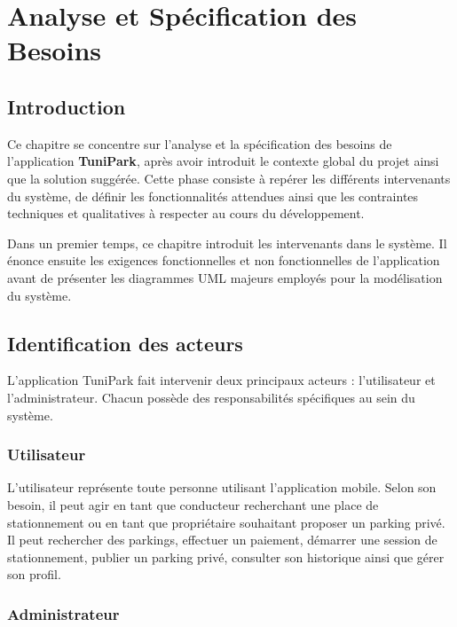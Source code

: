 \chapter{Analyse et Spécification des Besoins}
\label{chap:requirements_analysis}

\section{Introduction}

\par Ce chapitre se concentre sur l'analyse et la spécification des besoins de l'application \textbf{TuniPark}, après avoir introduit le contexte global du projet ainsi que la solution suggérée. Cette phase consiste à repérer les différents intervenants du système, de définir les fonctionnalités attendues ainsi que les contraintes techniques et qualitatives à respecter au cours du développement.

\par Dans un premier temps, ce chapitre introduit les intervenants dans le système. Il énonce ensuite les exigences fonctionnelles et non fonctionnelles de l'application avant de présenter les diagrammes UML majeurs employés pour la modélisation du système.
\section{Identification des acteurs}

\par L'application TuniPark fait intervenir deux principaux acteurs : l'utilisateur et l'administrateur. Chacun possède des responsabilités spécifiques au sein du système.

\subsection{Utilisateur}

\par L'utilisateur représente toute personne utilisant l'application mobile. Selon son besoin, il peut agir en tant que conducteur recherchant une place de stationnement ou en tant que propriétaire souhaitant proposer un parking privé. Il peut rechercher des parkings, effectuer un paiement, démarrer une session de stationnement, publier un parking privé, consulter son historique ainsi que gérer son profil.

\subsection{Administrateur}

